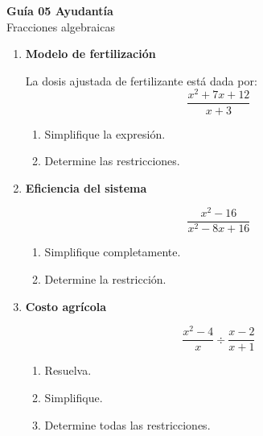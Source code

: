 \documentclass[11pt]{article}
\begin{document}
	
	\vspace*{0.5em}
	
	\begin{center}
		{\Large \textbf{Guía 05 Ayudantía}}\\[0.3em]
		{\small Fracciones algebraicas}
	\end{center}
	
	\vspace{0.2cm}
	
	
	\begin{enumerate}
			
		
				\item \textbf{Modelo de fertilización}
				
				La dosis ajustada de fertilizante está dada por:
				\[
				\frac{x^2+7x+12}{x+3}
				\]
				
				\begin{enumerate}[label=\alph*)]
					\item Simplifique la expresión.
					\item Determine las restricciones.
				\end{enumerate}
								
			
				\item \textbf{Eficiencia del sistema}
				
				\[
				\frac{x^2-16}{x^2-8x+16}
				\]
				
				\begin{enumerate}[label=\alph*)]
					\item Simplifique completamente.
					\item Determine la restricción.
				\end{enumerate}
				
				\item \textbf{Costo agrícola}
				
				\[
				\frac{x^2-4}{x}\div\frac{x-2}{x+1}
				\]
				
				\begin{enumerate}[label=\alph*)]
					\item Resuelva.
					\item Simplifique.
					\item Determine todas las restricciones.
				\end{enumerate}
				

\end{enumerate}
\end{document}

